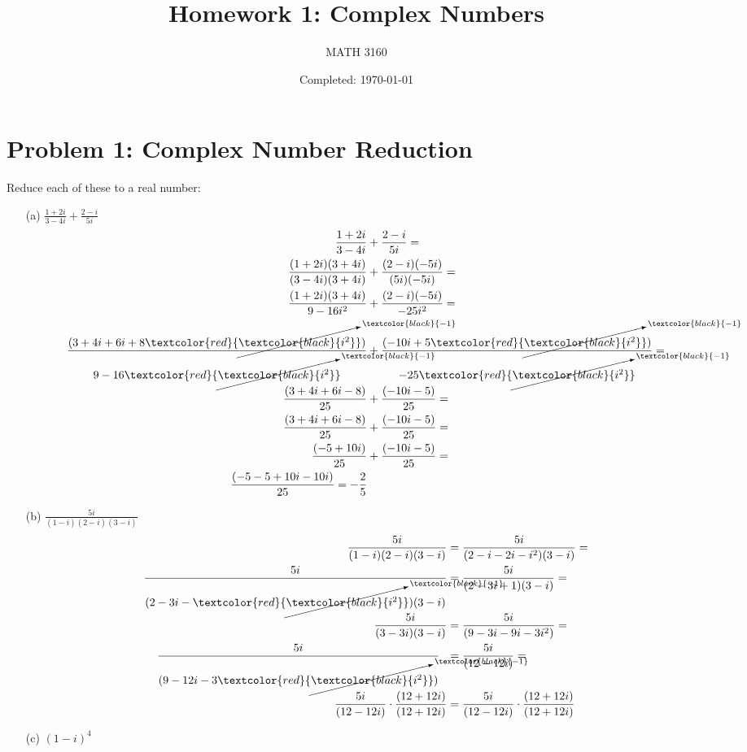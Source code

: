 \documentclass{article}
\title{Homework 1: Complex Numbers}
\author{
  MATH 3160\\
  \myauthor
}
\date{Completed: \today}
\newcommand{\canceling}[2]{\textcolor{red}{\cancelto{\textcolor{black}{#1}}{\textcolor{black}{#2}}}}
\begin{document}
\maketitle %


\section*{Problem 1: Complex Number Reduction}
Reduce each of these to a real number:
\begin{enumerate}
\item[(a)] $ \frac{1+2i}{3-4i} + \frac{2-i}{5i}$
  \begin{align*}
    \frac{1+2i}{3-4i} &+ \frac{2-i}{5i} = \\
    \frac{(1+2i)(3+4i)}{(3-4i)(3+4i)} &+ \frac{(2-i)(-5i)}{(5i)(-5i)} = \\
    \frac{(1+2i)(3+4i)}{9-16i^2} &+ \frac{(2-i)(-5i)}{-25i^2} = \\
    \frac{(3+4i+6i+8\canceling{-1}{i^2})}{9-16\canceling{-1}{i^2}} &+ \frac{(-10i+5\canceling{-1}{i^2})}{-25\canceling{-1}{i^2}} = \\
    \frac{(3+4i+6i-8)}{25} &+ \frac{(-10i-5)}{25} = \\
    \frac{(3+4i+6i-8)}{25} &+ \frac{(-10i-5)}{25} = \\
    \frac{(-5+10i)}{25} &+ \frac{(-10i-5)}{25} = \\
    \frac{(-5-5+10i -10i)}{25} = -\frac{2}{5}\\
  \end{align*}
\item[(b)] $ \frac{5i}{(1-i)(2-i)(3-i)}$
  \begin{align*}
    \frac{5i}{(1-i)(2-i)(3-i)} &= \frac{5i}{(2-i-2i-i^2)(3-i)} =\\
    \frac{5i}{(2-3i-\canceling{-1}{i^2})(3-i)} &= \frac{5i}{(2-3i+1)(3-i)} =\\
    \frac{5i}{(3-3i)(3-i)} &= \frac{5i}{(9-3i-9i-3i^2)} =\\
    \frac{5i}{(9-12i-3\canceling{-1}{i^2})}\ \ &= \frac{5i}{(12-12i)} =\\
    \frac{5i}{(12-12i)}\cdot\frac{(12+12i)}{(12+12i)} &= \frac{5i}{(12-12i)}\cdot\frac{(12+12i)}{(12+12i)}
  \end{align*}
\item[(c)] $ (1-i)^4$
\end{enumerate}
\end{document}
